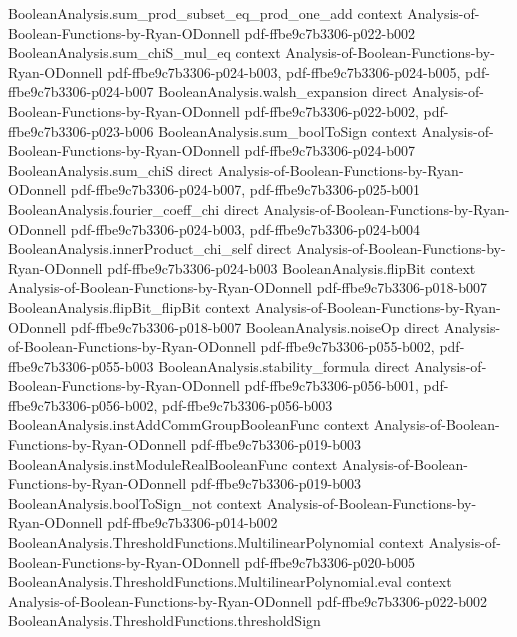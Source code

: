 \begin{lemma}
\proofstep
  {BooleanAnalysis.sum_prod_subset_eq_prod_one_add}
  {context}
  {Analysis-of-Boolean-Functions-by-Ryan-ODonnell}
  {pdf-ffbe9c7b3306-p022-b002}
\proofstep
  {BooleanAnalysis.sum_chiS_mul_eq}
  {context}
  {Analysis-of-Boolean-Functions-by-Ryan-ODonnell}
  {pdf-ffbe9c7b3306-p024-b003,
    pdf-ffbe9c7b3306-p024-b005,
    pdf-ffbe9c7b3306-p024-b007}
\proofstep
  {BooleanAnalysis.walsh_expansion}
  {direct}
  {Analysis-of-Boolean-Functions-by-Ryan-ODonnell}
  {pdf-ffbe9c7b3306-p022-b002,
    pdf-ffbe9c7b3306-p023-b006}
\proofstep
  {BooleanAnalysis.sum_boolToSign}
  {context}
  {Analysis-of-Boolean-Functions-by-Ryan-ODonnell}
  {pdf-ffbe9c7b3306-p024-b007}
\proofstep
  {BooleanAnalysis.sum_chiS}
  {direct}
  {Analysis-of-Boolean-Functions-by-Ryan-ODonnell}
  {pdf-ffbe9c7b3306-p024-b007,
    pdf-ffbe9c7b3306-p025-b001}
\proofstep
  {BooleanAnalysis.fourier_coeff_chi}
  {direct}
  {Analysis-of-Boolean-Functions-by-Ryan-ODonnell}
  {pdf-ffbe9c7b3306-p024-b003,
    pdf-ffbe9c7b3306-p024-b004}
\proofstep
  {BooleanAnalysis.innerProduct_chi_self}
  {direct}
  {Analysis-of-Boolean-Functions-by-Ryan-ODonnell}
  {pdf-ffbe9c7b3306-p024-b003}
\proofstep
  {BooleanAnalysis.flipBit}
  {context}
  {Analysis-of-Boolean-Functions-by-Ryan-ODonnell}
  {pdf-ffbe9c7b3306-p018-b007}
\proofstep
  {BooleanAnalysis.flipBit_flipBit}
  {context}
  {Analysis-of-Boolean-Functions-by-Ryan-ODonnell}
  {pdf-ffbe9c7b3306-p018-b007}
\proofstep
  {BooleanAnalysis.noiseOp}
  {direct}
  {Analysis-of-Boolean-Functions-by-Ryan-ODonnell}
  {pdf-ffbe9c7b3306-p055-b002,
    pdf-ffbe9c7b3306-p055-b003}
\proofstep
  {BooleanAnalysis.stability_formula}
  {direct}
  {Analysis-of-Boolean-Functions-by-Ryan-ODonnell}
  {pdf-ffbe9c7b3306-p056-b001,
    pdf-ffbe9c7b3306-p056-b002,
    pdf-ffbe9c7b3306-p056-b003}
\proofstep
  {BooleanAnalysis.instAddCommGroupBooleanFunc}
  {context}
  {Analysis-of-Boolean-Functions-by-Ryan-ODonnell}
  {pdf-ffbe9c7b3306-p019-b003}
\proofstep
  {BooleanAnalysis.instModuleRealBooleanFunc}
  {context}
  {Analysis-of-Boolean-Functions-by-Ryan-ODonnell}
  {pdf-ffbe9c7b3306-p019-b003}
\proofstep
  {BooleanAnalysis.boolToSign_not}
  {context}
  {Analysis-of-Boolean-Functions-by-Ryan-ODonnell}
  {pdf-ffbe9c7b3306-p014-b002}
\proofstep
  {BooleanAnalysis.ThresholdFunctions.MultilinearPolynomial}
  {context}
  {Analysis-of-Boolean-Functions-by-Ryan-ODonnell}
  {pdf-ffbe9c7b3306-p020-b005}
\proofstep
  {BooleanAnalysis.ThresholdFunctions.MultilinearPolynomial.eval}
  {context}
  {Analysis-of-Boolean-Functions-by-Ryan-ODonnell}
  {pdf-ffbe9c7b3306-p022-b002}
\proofstep
  {BooleanAnalysis.ThresholdFunctions.thresholdSign}

\end{lemma}
